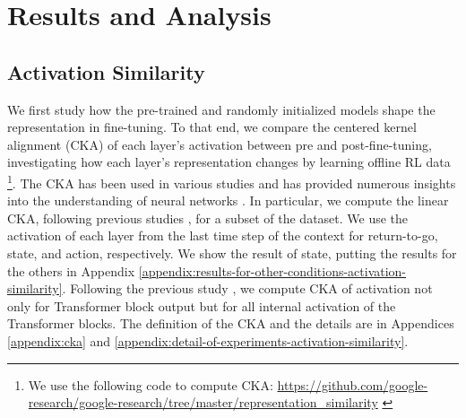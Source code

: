 \section{Results and Analysis}
\label{section:results-and-analysis}

\subsection{Activation Similarity}
\label{section:activation-similarity}
We first study how the pre-trained and randomly initialized models shape the representation in fine-tuning. To that end, we compare the centered kernel alignment (CKA) \cite{kornblith2019similarity} of each layer's activation between pre and post-fine-tuning, investigating how each layer's representation changes by learning offline RL data \footnote{We use the following code to compute CKA: \href{https://github.com/google-research/google-research/tree/master/representation_similarity}{https://github.com/google-research/google-research/tree/master/representation\_similarity} \cite{kornblith2019similarity}}. The CKA has been used in various studies and has provided numerous insights into the understanding of neural networks \cite{Raghu2020Rapid,wu-etal-2020-similarity,Neyshabur20,raghu2021vision,ramasesh2021anatomy}. In particular, we compute the linear CKA, following previous studies \cite{kornblith2019similarity,nguyen2021do}, for a subset of the dataset. We use the activation of each layer from the last time step of the context for return-to-go, state, and action, respectively. We show the result of state, putting the results for the others in Appendix \ref{appendix:results-for-other-conditions-activation-similarity}. Following the previous study \cite{raghu2021vision}, we compute CKA of activation not only for Transformer block output but for all internal activation of the 
Transformer blocks. The definition of the CKA and the details are in Appendices \ref{appendix:cka} and \ref{appendix:detail-of-experiments-activation-similarity}. 

